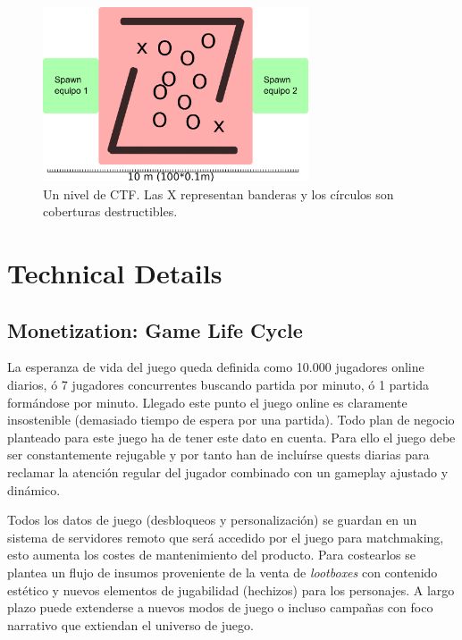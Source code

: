 \documentclass[12pt]{report}
\begin{document}
\begin{figure}[H]
    \centering
    \includegraphics[width=0.7\textwidth]{flags}
    \caption{Un nivel de CTF. Las X representan banderas y los círculos son coberturas destructibles.}
\end{figure}

\newpage

\chapter{Technical Details}

\section{Monetization: Game Life Cycle}

La esperanza de vida del juego queda definida como 10.000 jugadores online diarios, ó 7 jugadores concurrentes buscando partida por minuto, ó 1 partida formándose por minuto. Llegado este punto el juego online es claramente insostenible (demasiado tiempo de espera por una partida). Todo plan de negocio planteado para este juego ha de tener este dato en cuenta. Para ello el juego debe ser constantemente rejugable y por tanto han de incluírse quests diarias para reclamar la atención regular del jugador combinado con un gameplay ajustado y dinámico.

Todos los datos de juego (desbloqueos y personalización) se guardan en un sistema de servidores remoto que será accedido por el juego para matchmaking, esto aumenta los costes de mantenimiento del producto. Para costearlos se plantea un flujo de insumos proveniente de la venta de \textit{lootboxes} con contenido estético y nuevos elementos de jugabilidad (hechizos) para los personajes. A largo plazo puede extenderse a nuevos modos de juego o incluso campañas con foco narrativo que extiendan el universo de juego.

\newpage
\end{document}
